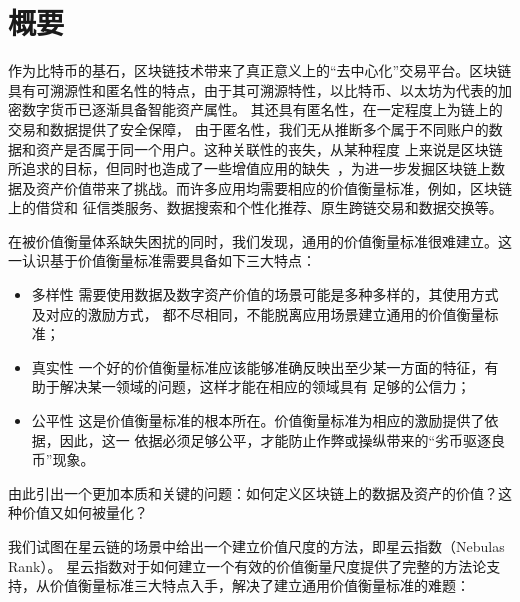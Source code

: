 
\section{概要}
作为比特币的基石，区块链技术带来了真正意义上的“去中心化”交易平台。区块链具有可溯源性和匿名性的特点，由于其可溯源特性，以比特币、以太坊为代表的加密数字货币已逐渐具备智能资产属性。
其还具有匿名性，在一定程度上为链上的交易和数据提供了安全保障，
由于匿名性，我们无从推断多个属于不同账户的数据和资产是否属于同一个用户。这种关联性的丧失，从某种程度
上来说是区块链所追求的目标，但同时也造成了一些增值应用的缺失~\cite{meiklejohn2013fistful}，为进一步发掘区块链上数据及资产价值带来了挑战。而许多应用均需要相应的价值衡量标准，例如，区块链上的借贷和
征信类服务、数据搜索和个性化推荐、原生跨链交易和数据交换等。



在被价值衡量体系缺失困扰的同时，我们发现，通用的价值衡量标准很难建立。这一认识基于价值衡量标准需要具备如下三大特点：

\begin{itemize}
\item{多样性} 需要使用数据及数字资产价值的场景可能是多种多样的，其使用方式及对应的激励方式，
都不尽相同，不能脱离应用场景建立通用的价值衡量标准；
\item{真实性} 一个好的价值衡量标准应该能够准确反映出至少某一方面的特征，有助于解决某一领域的问题，这样才能在相应的领域具有
足够的公信力；
\item{公平性} 这是价值衡量标准的根本所在。价值衡量标准为相应的激励提供了依据，因此，这一
依据必须足够公平，才能防止作弊或操纵带来的“劣币驱逐良币”现象。
\end{itemize}

由此引出一个更加本质和关键的问题：如何定义区块链上的数据及资产的价值？这种价值又如何被量化？


我们试图在星云链的场景中给出一个建立价值尺度的方法，即星云指数（Nebulas Rank）。
星云指数对于如何建立一个有效的价值衡量尺度提供了完整的方法论支持，从价值衡量标准三大特点入手，解决了建立通用价值衡量标准的难题：

